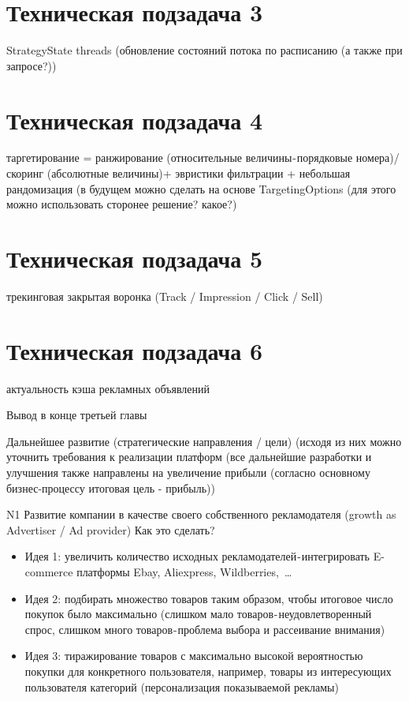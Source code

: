 \documentclass[times]{itmo-student-thesis}
\begin{document}
\section{Техническая подзадача 3}
StrategyState threads (обновление состояний потока по расписанию (а также при запросе?))

\section{Техническая подзадача 4}
таргетирование = ранжирование (относительные величины - порядковые номера)/ скоринг (абсолютные величины)+ эвристики фильтрации + небольшая рандомизация (в будущем можно сделать на основе TargetingOptions (для этого можно использовать сторонее решение? какое?)

\section{Техническая подзадача 5}
трекинговая закрытая воронка (Track / Impression / Click / Sell)

\section{Техническая подзадача 6} актуальность кэша рекламных объявлений


\chapterconclusion

Вывод в конце третьей главы

\startconclusionpage

Дальнейшее развитие (стратегические направления / цели) (исходя из них можно уточнить требования к реализации платформ
(все дальнейшие разработки и улучшения также направлены на увеличение прибыли (согласно основному бизнес-процессу итоговая цель - прибыль))

N1 Развитие компании в качестве своего собственного рекламодателя (growth as Advertiser / Ad provider)
Как это сделать?
\begin{itemize}
\item Идея 1: увеличить количество исходных рекламодателей - интегрировать E-commerce платформы Ebay, Aliexpress, Wildberries, …
\item Идея 2: подбирать множество товаров таким образом, чтобы итоговое число покупок было максимально (слишком мало товаров - неудовлетворенный спрос, слишком много товаров - проблема выбора и рассеивание внимания)
\item Идея 3: тиражирование товаров с максимально высокой вероятностью покупки для конкретного пользователя, например, товары из интересующих пользователя категорий (персонализация показываемой рекламы)
\end{itemize}
\end{document}
